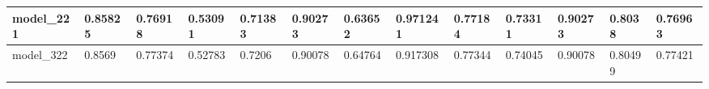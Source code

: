 \begin{tabular}{|l|l|l|l|l|l|l|l|l|l|l|l|l|}
model\_221     & 0.85825     & 0.76918        & 0.53091      & 0.71383          & 0.90273              & 0.63652              & 0.971241     & 0.77184           & 0.73311            & 0.90273         & 0.8038      & 0.76963      \\ \hline
model\_322     & 0.8569      & 0.77374        & 0.52783      & 0.7206           & 0.90078              & 0.64764              & 0.917308     & 0.77344           & 0.74045            & 0.90078         & 0.80499     & 0.77421      \\ \hline
\end{tabular}